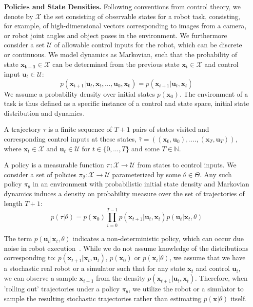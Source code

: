 \documentclass[10pt, conference]{ieeeconf}      %
\newcommand{\bu}{\mathbf{u}}
\newcommand{\bx}{\mathbf{x}}
\begin{document}
\noindent\textbf{Policies and State Densities.}
Following conventions from control theory, we denote by $\mathcal{X}$ the set consisting of observable states for a robot task, consisting, for example, of 
high-dimensional vectors corresponding to images from a camera, or robot joint angles and object poses in the environment.
We furthermore consider a set $\mathcal{U}$ of allowable control inputs for the robot, which can be discrete or
continuous. We model dynamics as Markovian, such that the probability of state $\mathbf{x_{t+1}}\in
\mathcal{X}$ can be determined from the previous state $\mathbf{x}_t\in\mathcal{X}$ and control input $\mathbf{u}_t\in
\mathcal{U}$: 
$$p(\bx_{t+1}|\bu_{t},\bx_{t}, \ldots, \bu_{0}, \bx_{0})=p(\bx_{t+1}|\bu_{t}, \bx_t)$$
We assume a probability density over initial states $p(\bx_0)$. The environment of a task is thus defined as a specific instance of a control and state space, initial state distribution and dynamics. 



A trajectory $\tau$ is a finite sequence of $T+1$ pairs of states visited and corresponding
control inputs at these states, $\bar{\tau} = ((\mathbf{x}_0,\mathbf{u}_0), ...., (\mathbf{x}_T,\mathbf{u}_T))$, where $\bx_t\in \mathcal{X}$
and $\bu_t\in \mathcal{U}$ for $t\in \{0, \ldots, T\}$ and some $T\in \mathbb{N}$.  



A policy is a measurable function $\pi: \mathcal{X} \to \mathcal{U}$ from states to control inputs. 
We consider a set of policies $\pi_{\theta}:\mathcal{X}\to \mathcal{U}$ parameterized by some $\theta\in \Theta$. Any such policy $\pi_{\theta}$ in an environment with probabilistic initial state density and Markovian dynamics
induces a density on probability measure over the set of  trajectories of length $T+1$: $$p(\tau | \theta)=
p(\bx_0)\prod_{i=0}^{T-1}p(\bx_{t+1}|\bu_t,\bx_t)p(\bu_t|\bx_t,\theta)$$


The term $p(\bu_t|\bx_t,\theta)$ indicates a non-deterministic policy, which can occur due noise in robot execution~\cite{mahler2014learning}. While we do not assume knowledge of the distributions corresponding to: $p(\bx_{t+1}|\bx_t,\bu_t)$, $p(\bx_0)$ or $p(\bx_t|
\theta)$, we assume that we have a stochastic real robot or a simulator such that for any state
$\bx_t$ and control $\bu_t$, we can observe a sample $\bx_{t+1}$ from the density $p(\bx_{t+1}|\bu_t,\bx_t)$. 
Therefore, when 'rolling out' trajectories under a policy
$\pi_{\theta}$, we utilize the robot or a simulator to sample the resulting stochastic trajectories rather than
estimating $p(\bx|\theta)$ itself.
\end{document}
